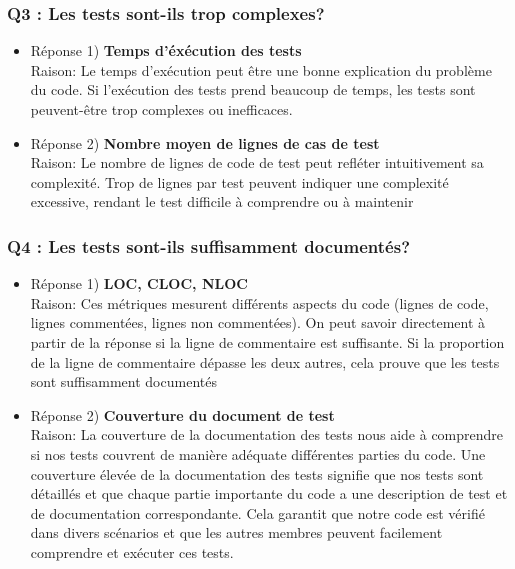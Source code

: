 \documentclass{proc}
\begin{document}
\subsubsection*{Q3 : Les tests sont-ils trop complexes?}
\begin{itemize}
   \item Réponse 1) \textbf{Temps d'éxécution des tests}
   \\Raison:
   Le temps d'exécution peut être une bonne explication du problème du code. Si l'exécution des tests prend beaucoup de temps, les tests sont peuvent-être trop complexes ou inefficaces.
   \item Réponse 2) \textbf{Nombre moyen de lignes de cas de test}
   \\Raison:
   Le nombre de lignes de code de test peut refléter intuitivement sa complexité. Trop de lignes par test peuvent indiquer une complexité excessive, rendant le test difficile à comprendre ou à maintenir
\end{itemize}

\subsubsection*{Q4 : Les tests sont-ils suffisamment documentés?}
\begin{itemize}
   \item Réponse 1) \textbf{LOC, CLOC, NLOC}
   \\Raison:
   Ces métriques mesurent différents aspects du code (lignes de code, lignes commentées, lignes non commentées). On peut savoir directement à partir de la réponse si la ligne de commentaire est suffisante. Si la proportion de la ligne de commentaire dépasse les deux autres, cela prouve que les tests sont suffisamment documentés
   \item Réponse 2) \textbf{Couverture du document de test}   
   \\Raison:
   La couverture de la documentation des tests nous aide à comprendre si nos tests couvrent de manière adéquate différentes parties du code. Une couverture élevée de la documentation des tests signifie que nos tests sont détaillés et que chaque partie importante du code a une description de test et de documentation correspondante. Cela garantit que notre code est vérifié dans divers scénarios et que les autres membres peuvent facilement comprendre et exécuter ces tests.
\end{itemize}
\end{document}
